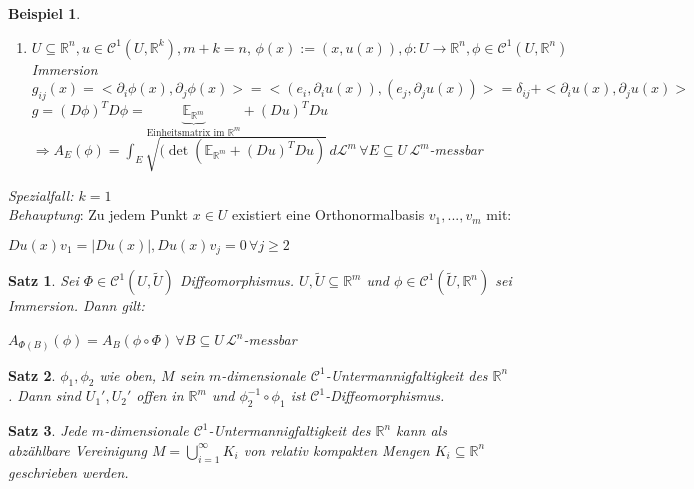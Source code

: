 \documentclass[11pt]{memoir}
\theoremstyle{changebreak}
\newtheorem{Beispiel}{Beispiel}[chapter]
\newtheorem{Satz}{Satz}[chapter]
\begin{document}
\begin{Beispiel}
\begin{enumerate}
	\item $U \subseteq \mathbb R^n, u \in \mathscr C^1(U, \mathbb R^k), m+k =n,\, \phi(x) := (x, u(x)), \phi: U \rightarrow \mathbb R^n, \phi \in \mathscr C^1(U, \mathbb R^n)$ Immersion \\
	$g_{ij}(x) = <\partial_i \phi(x), \partial_j \phi(x)> = <(e_i, \partial_i u(x)), (e_j, \partial_j u(x))> =
	\delta_{ij} + <\partial_i u(x), \partial_j u(x)> $ \\
	$g = (D\phi)^T D\phi = \underbrace{\mathbb E_{\mathbb R^m}}_{\text{Einheitsmatrix im }\mathbb R^m} + (Du)^TDu$  \\%
	$\Rightarrow A_E(\phi) = \int_E \sqrt{(\det(\mathbb E_{\mathbb R^m} +(Du)^TDu)}\,d\mathscr L^m \, \forall E \subseteq U\, \mathscr L^m$-messbar
\end{enumerate}
\end{Beispiel}

\emph{Spezialfall: $k=1$} \\
\emph{Behauptung}: Zu jedem Punkt $x \in U$ existiert eine Orthonormalbasis $v_1, ... , v_m$ mit:
\begin{center}
	$Du(x) v_1 = |Du(x)|, Du(x) v_j = 0\, \forall j \geq 2$
\end{center}


\begin{Satz}
Sei $\Phi \in \mathscr C^1(U, \tilde U)$ Diffeomorphismus. $U, \tilde U \subseteq \mathbb R^m$ und $\phi \in \mathscr C^1(\tilde U, \mathbb R^n)$ sei Immersion. Dann gilt:
\begin{center}
	$A_{\Phi(B)}(\phi) = A_B (\phi \circ \Phi) \, \forall B \subseteq U \, \mathscr L^n$-messbar
\end{center}
\end{Satz}

\begin{Satz}
$\phi_1, \phi_2$ wie oben, $M$ sein $m$-dimensionale $\mathscr C^1$-Untermannigfaltigkeit des $\mathbb R^n$. Dann sind $U_1 ', U_2 '$ offen in $\mathbb R^m$ und $\phi_2^{-1}\circ \phi_1$ ist $\mathscr C^1$-Diffeomorphismus.
\end{Satz}

\begin{Satz}
Jede $m$-dimensionale $\mathscr C^1$-Untermannigfaltigkeit des $\mathbb R^n$ kann als abzählbare Vereinigung $M = \bigcup\limits_{i=1}^\infty K_i$ von relativ kompakten Mengen $K_i \subseteq \mathbb R^n$ geschrieben werden.
\end{Satz}
\end{document}
